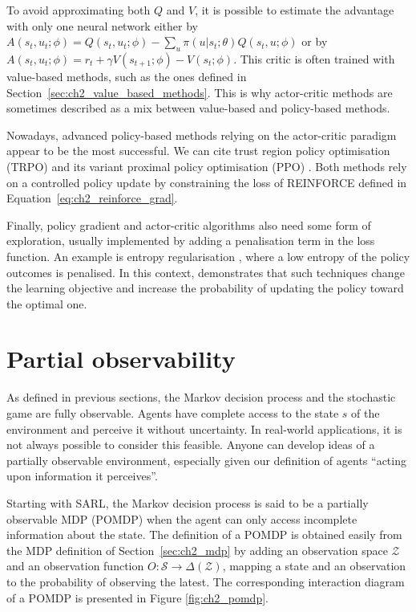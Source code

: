 To avoid approximating both $Q$ and $V$, it is possible to estimate the advantage with only one neural network either by $A(s_t,u_t; \phi)=Q(s_t, u_t;\phi)-\sum_u \pi(u|s_t;\theta) Q(s_t,u; \phi)$ or by $A(s_t,u_t; \phi)=r_t +\gamma V(s_{t+1};\phi) - V(s_t;\phi)$.
This critic is often trained with value-based methods, such as the ones defined in Section~\ref{sec:ch2_value_based_methods}.
This is why actor-critic methods are sometimes described as a mix between value-based and policy-based methods.

Nowadays, advanced policy-based methods relying on the actor-critic paradigm appear to be the most successful.
We can cite trust region policy optimisation (TRPO) \citep{schulman2015trust} and its variant proximal policy optimisation (PPO) \citep{schulman2017ppo}.
Both methods rely on a controlled policy update by constraining the loss of REINFORCE defined in Equation~\ref{eq:ch2_reinforce_grad}.

Finally, policy gradient and actor-critic algorithms also need some form of exploration, usually implemented by adding a penalisation term in the loss function. 
An example is entropy regularisation \citep{williams1991function}, where a low entropy of the policy outcomes is penalised.
In this context, \cite{bolland2024behind} demonstrates that such techniques change the learning objective and increase the probability of updating the policy toward the optimal one.

\section{Partial observability} \label{sec:ch2_partial_observability}

As defined in previous sections, the Markov decision process and the stochastic game are fully observable.
Agents have complete access to the state $s$ of the environment and perceive it without uncertainty.
In real-world applications, it is not always possible to consider this feasible.
Anyone can develop ideas of a partially observable environment, especially given our definition of agents ``acting upon information it perceives''.

Starting with SARL, the Markov decision process is said to be a partially observable MDP (POMDP) \citep{KAELBLING199899} when the agent can only access incomplete information about the state.
The definition of a POMDP is obtained easily from the MDP definition of Section~\ref{sec:ch2_mdp} by adding an observation space $\mathcal{Z}$ and an observation function $O:\mathcal{S} \rightarrow \Delta(\mathcal{Z})$, mapping a state and an observation to the probability of observing the latest.
The corresponding interaction diagram of a POMDP is presented in Figure \ref{fig:ch2_pomdp}.

